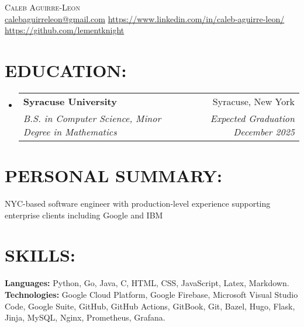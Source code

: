 \documentclass[letterpaper,10pt]{article}
\makeatletter
\newcommand{\resumeEducationHeading}[4]{
  \vspace{-2pt}\item
    \begin{tabular*}{0.97\textwidth}[t]{l@{\extracolsep{\fill}}r}
      \textbf{#1} & #2 \\
      \textit{\small#3} & \textit{\small #4} \\
    \end{tabular*}\vspace{-5pt}
}
\newcommand{\resumeSubHeadingListStart}{\begin{itemize}[leftmargin=0.15in, label={}]}
\newcommand{\resumeSubHeadingListEnd}{\end{itemize}\vspace{-10pt}}
\makeatother
\begin{document}

\begin{center}
    {\Large \textsc{Caleb Aguirre-Leon}} \\ \vspace{3pt}
    \small
    \hspace{.5pt}  \href{mailto:calebaguirreleon@gmail.com}{\faEnvelope  \hspace{0.125em} calebaguirreleon@gmail.com} \quad
    \hspace{.5pt}  \href{https://www.linkedin.com/in/caleb-aguirre-leon/}{\faLinkedin \hspace{0.125em} https://www.linkedin.com/in/caleb-aguirre-leon/} \quad
    \hspace{.5pt}  \href{https://github.com/lementknight}{\faGithub \hspace{0.125em} https://github.com/lementknight}
\end{center}

\section{\textbf{EDUCATION:}}
  \resumeSubHeadingListStart
    \resumeEducationHeading
      {Syracuse University
      }{Syracuse, New York}
      {B.S. in Computer Science, Minor Degree in Mathematics}{Expected Graduation December 2025}
  \resumeSubHeadingListEnd


\section{\textbf{PERSONAL SUMMARY:}}
  \vspace{2pt}
  \resumeSubHeadingListStart
    \small{\item{
        {NYC-based software engineer with production-level experience supporting enterprise clients including Google and IBM} \\ \vspace{3pt}
    }}
  \resumeSubHeadingListEnd


\section{\textbf{SKILLS:}}
  \vspace{2pt}
  \resumeSubHeadingListStart
    \small{\item{
        \textbf{Languages:}{ Python, Go, Java, C, HTML, CSS, JavaScript, Latex, Markdown.} \\ \vspace{3pt}
        \textbf{Technologies:}{ Google Cloud Platform, Google Firebase, Microsoft Visual Studio Code, Google Suite, GitHub, GitHub Actions, GitBook, Git, Bazel, Hugo, Flask, Jinja, MySQL, Nginx, Prometheus, Grafana.} \\ \vspace{3pt}
    }}
  \resumeSubHeadingListEnd
\end{document}
